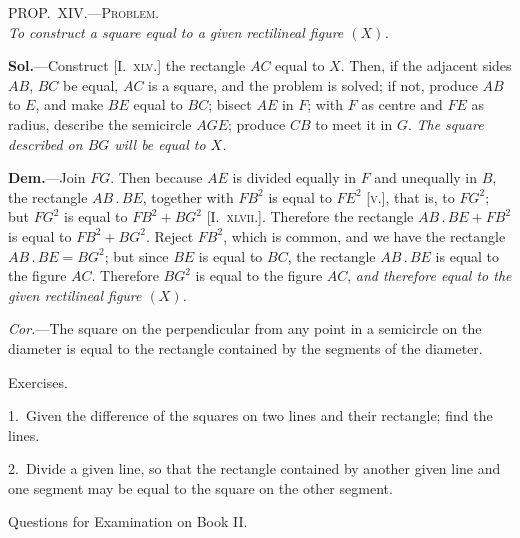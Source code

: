 \documentclass[oneside]{book}
\newcommand\myprop[2]{
\bigskip\Needspace*{4\baselineskip}\begin{center}\textsc{#1}\\\medskip\emph{#2}\par\end{center}
}
\newcommand\exhead[1]{
\Needspace*{5\baselineskip}\begin{center}
\textsf{#1}
\end{center}
}
\newcommand\imgcent[2]{
\begin{center}
\end{center}
}
\begin{document}
\myprop{PROP\@.~XIV\@.---Problem.}{To construct a square equal to a given rectilineal figure $(X)$.}

\imgcent{225}{f099}

\textbf{Sol.}---Construct [I.~\textsc{xlv.}] the rectangle $AC$ equal to
$X$. Then, if the adjacent sides $AB$, $BC$ be equal, $AC$
is a square, and the problem is solved; if not, produce
$AB$ to $E$, and make $BE$ equal to $BC$; bisect $AE$ in $F$;
with $F$ as centre and $FE$ as radius, describe the semicircle
$AGE$; produce $CB$ to meet it in $G$. \textit{The square
described on $BG$ will be equal to $X$.}

\textbf{Dem.}---Join $FG$. Then because $AE$ is divided
equally in $F$ and unequally in $B$, the rectangle $AB\,.\,BE$,
together with $FB^{2}$ is equal to $FE^{2}$ [\textsc{v.}], that is, to $FG^{2}$;
but $FG^{2}$ is equal to $FB^{2} + BG^{2}$ [I.~\textsc{xlvii.}]. Therefore
the rectangle $AB\,.\,BE + FB^{2}$ is equal to $FB^{2} + BG^{2}$.
Reject $FB^{2}$, which is common, and we have the rectangle
$AB\,.\,BE = BG^{2}$; but since $BE$ is equal to $BC$,
the rectangle $AB\,.\,BE$ is equal to the figure $AC$.
Therefore $BG^{2}$ is equal to the figure $AC$, \textit{and therefore
equal to the given rectilineal figure $(X)$.}

\textit{Cor.}---The square on the perpendicular from any
point in a semicircle on the diameter is equal to the
rectangle contained by the segments of the diameter.


\exhead{Exercises.}

\begin{footnotesize}
1.~Given the difference of the squares on two lines and their
rectangle; find the lines.

2.~Divide a given line, so that the rectangle contained by
another given line and one segment may be equal to the square
on the other segment.
\par\end{footnotesize}

\exhead{Questions for Examination on Book II\@.}
\end{document}
